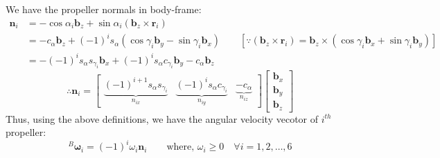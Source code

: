 We have the propeller normals in body-frame:
\begin{align*}
    \pmb{n}_i &= -\cos \alpha_i \pmb{b}_z + \sin \alpha_i ( \pmb b_z \times \pmb r_i)\\
    &= -c_{\alpha} \pmb b_z + (-1)^{i} s_{\alpha}( \cos \gamma_i \pmb b_y - \sin \gamma_i \pmb b_x) \qquad
    [\because ( \pmb b_z \times \pmb r_i) = \pmb b_z \times (\cos \gamma_i \pmb b_x + \sin \gamma_i \pmb b_y)]\\
    &= -(-1)^i s_{\alpha} s_{\gamma_i} \pmb b_x + (-1)^{i} s_{\alpha} c_{\gamma_i} \pmb b_y - c_{\alpha} \pmb b_z
\end{align*}
$$\therefore \pmb{n}_i = \begin{bmatrix}
    \underbrace{(-1)^{i+1} s_{\alpha} s_{\gamma_i}}_{n_{ix}} &
    \underbrace{(-1)^{i} s_{\alpha} c_{\gamma_i}}_{n_{iy}} &
    \underbrace{- c_{\alpha}}_{n_{iz}}
\end{bmatrix} \begin{bmatrix}
    \pmb b_x \\ \pmb b_y \\ \pmb b_z
\end{bmatrix}
$$
Thus, using the above definitions, we have the angular velocity vecotor of $i^{th}$ propeller:
$${}^B\pmb \omega_i = (-1)^{i} \omega_i \pmb n_i \qquad \text{where, }\omega_i \geq 0 \quad \forall i = 1, 2, \hdots, 6$$
%
%
